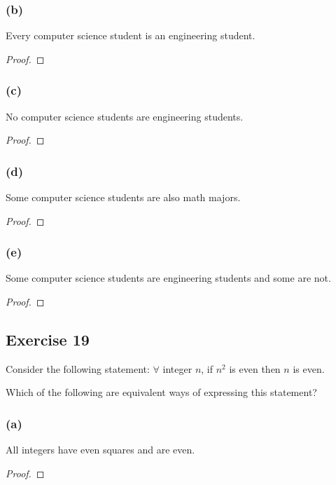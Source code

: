 \documentclass[14pt]{extarticle}
\newcommand{\fa}{\forall}
\begin{document}
\subsubsection{(b)}
Every computer science student is an engineering student.

\begin{proof}

\end{proof}

\subsubsection{(c)}
No computer science students are engineering students.

\begin{proof}

\end{proof}

\subsubsection{(d)}
Some computer science students are also math majors.

\begin{proof}

\end{proof}

\subsubsection{(e)}
Some computer science students are engineering students and some are not.

\begin{proof}

\end{proof}

\subsection{Exercise 19}
Consider the following statement: $\fa$ integer $n$, if $n^2$ is even then $n$ is even.

Which of the following are equivalent ways of expressing this statement?

\subsubsection{(a)}
All integers have even squares and are even.
\begin{proof}

\end{proof}
\end{document}
